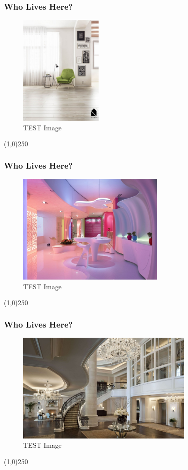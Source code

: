 \begin{frame}
\frametitle{Who Lives Here?}
\begin{figure}
	\centering
		\includegraphics[height=5.5cm]{./img/CGArchViz/KeepCalm.jpg}
	\caption{TEST Image}
	\label{fig:.keep calm.., VAVO Studio}
\end{figure}
\end{frame}
\begin{center}\line(1,0){250}\end{center}



\begin{frame}
\frametitle{Who Lives Here?}
\begin{figure}
	\centering
		\includegraphics[height=5.5cm]{img/A1.jpg}
	\caption{TEST Image}
	\label{fig:SampleA1}
\end{figure}
\end{frame}
\begin{center}\line(1,0){250}\end{center}



\begin{frame}
\frametitle{Who Lives Here?}
\begin{figure}
	\centering
		\includegraphics[height=5.5cm]{img/B.jpg}
	\caption{TEST Image}
	\label{fig:SampleB}
\end{figure}
\end{frame}
\begin{center}\line(1,0){250}\end{center}



